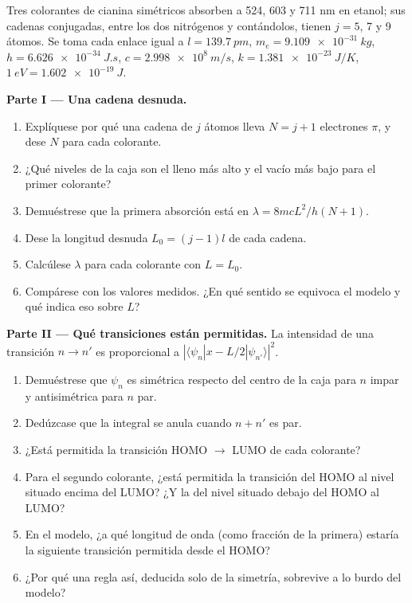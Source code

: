 \begin{problem}
\label{pb:b3:quantum-model-systems:1}
Tres colorantes de cianina simétricos absorben a 524, 603 y 711 nm en etanol; sus
cadenas conjugadas, entre los dos nitrógenos y contándolos, tienen $j = 5$, 7
y 9 átomos. Se toma cada enlace igual a $l = \qty{139.7}{pm}$, $m_e =
\qty{9.109e-31}{kg}$, $h = \qty{6.626e-34}{J.s}$, $c = \qty{2.998e8}{m/s}$,
$k = \qty{1.381e-23}{J/K}$, $\qty{1}{eV} = \qty{1.602e-19}{J}$.

\medskip\noindent\textbf{Parte I --- Una cadena desnuda.}
\begin{enumerate}
  \item Explíquese por qué una cadena de $j$ átomos lleva $N = j + 1$ electrones $\pi$, y
        dese $N$ para cada colorante.
  \item ¿Qué niveles de la caja son el lleno más alto y el vacío más bajo
        para el primer colorante?
  \item Demuéstrese que la primera absorción está en $\lambda = 8mcL^2/h(N+1)$.
  \item Dese la longitud desnuda $L_0 = (j - 1)l$ de cada cadena.
  \item Calcúlese $\lambda$ para cada colorante con $L = L_0$.
  \item Compárese con los valores medidos. ¿En qué sentido se equivoca el modelo
        y qué indica eso sobre $L$?
\end{enumerate}

\medskip\noindent\textbf{Parte II --- Qué transiciones están permitidas.}
La intensidad de una transición $n \to n'$ es proporcional a $|\langle
\psi_n|x - L/2|\psi_{n'}\rangle|^2$.
\begin{enumerate}[resume]
  \item Demuéstrese que $\psi_n$ es simétrica respecto del centro de la caja para $n$
        impar y antisimétrica para $n$ par.
  \item Dedúzcase que la integral se anula cuando $n + n'$ es par.
  \item ¿Está permitida la transición HOMO $\to$ LUMO de cada colorante?
  \item Para el segundo colorante, ¿está permitida la transición del HOMO al nivel
        situado encima del LUMO? ¿Y la del nivel situado debajo del HOMO al LUMO?
  \item En el modelo, ¿a qué longitud de onda (como fracción de la primera)
        estaría la siguiente transición permitida desde el HOMO?
  \item ¿Por qué una regla así, deducida solo de la simetría, sobrevive a lo
        burdo del modelo?
\end{enumerate}


\end{problem}

